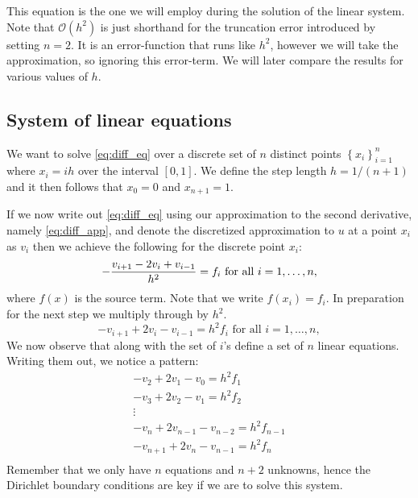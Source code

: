 \documentclass[10pt,a4paper]{amsart}
\begin{document}
  This equation is the one we will employ during the solution of the linear
  system. Note that $\mathcal{O}(h^2)$ is just shorthand for the truncation
  error introduced by setting $n = 2$. It  is an error-function that runs like
  $h^2$, however we will take the approximation, so ignoring this error-term.
  We will later compare the results for various values of $h$. 

  \subsection{System of linear equations}
  \label{sub:system_of_linear_equations}
  
  We want to solve \cref{eq:diff_eq} over a discrete set of $n$ distinct points
  $\left\{ x_i \right\}_{i=1}^n$ where $x_i = ih$ over the interval $[0, 1]$.
  We define the step length $h = 1 / (n+1)$ and it then follows that $x_0 =
  0$ and $x_{n+1} = 1$.

  If we now write out \cref{eq:diff_eq} using our approximation to the second
  derivative, namely \cref{eq:diff_app}, and denote the discretized
  approximation to $u$ at a point $x_i$ as $v_i$ then we achieve the following
  for the discrete point $x_i$:
  \begin{equation}
    \notag
    -\frac{v_{i+1} - 2v_i + v_{i-1}}{h^2} = f_i \text{ for all } i = 1, \ldots, n,
  \end{equation} 
  where $f(x)$ is the source term. Note that we write $f(x_i) = f_i$.  In
  preparation for the next step we multiply through by $h^2$.
  \begin{equation}
    \label{eq:set_eq}
    -v_{i+1} + 2v_i - v_{i-1} = h^2f_i \text{ for all } i = 1, \ldots, n,
  \end{equation} 
  We now observe that  along with the set of $i$'s define a set
  of $n$ linear equations. Writing them out, we notice a pattern:
  \begin{gather*}
    \label{eq:system}
    -v_2 + 2v_1 - v_0 = h^2f_1 \\
    -v_3 + 2v_2 - v_1 = h^2f_2 \\
                      \vdots \\
    -v_{n} + 2v_{n-1} - v_{n-2} = h^2f_{n-1} \\
    -v_{n+1}+ 2v_n - v_{n-1} = h^2f_n \\
  \end{gather*}
  Remember that we only have $n$ equations and $n+2$ unknowns, hence the
  Dirichlet boundary conditions are key if we are to solve this system.
\end{document}
